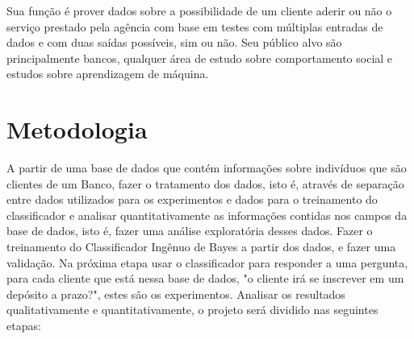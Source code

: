 \documentclass[conference]{IEEEtran}
\begin{document}
Sua função é prover dados sobre a possibilidade de um cliente aderir ou não o serviço prestado pela agência com base em testes com múltiplas entradas de dados e com duas saídas possíveis, sim ou não. Seu público alvo são principalmente bancos, qualquer área de estudo sobre comportamento social e estudos sobre aprendizagem de máquina.
\section{Metodologia}

A partir de uma base de dados que contém informações sobre indivíduos que são clientes de um Banco, fazer o tratamento dos dados, isto é, através de separação entre dados utilizados para os experimentos e dados para o treinamento do classificador e analisar quantitativamente as informações contidas nos campos da base de dados, isto é, fazer uma análise exploratória desses dados. 
Fazer o treinamento do Classificador Ingênuo de Bayes a partir dos dados, e fazer uma validação. Na próxima etapa usar o classificador para responder a uma pergunta, para cada cliente que está nessa base de dados, "o cliente irá se inscrever em um depósito a prazo?", estes são os experimentos. Analisar os resultados qualitativamente e quantitativamente, o projeto será dividido nas seguintes etapas:
\end{document}
